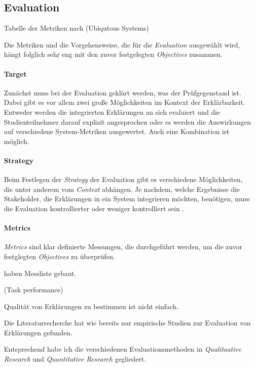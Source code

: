 \subsection{Evaluation}
\label{sec:model_evaluation}

Tabelle der Metriken nach \cite{carvalho2017quality} (Ubiqutous Systems)

Die Metriken und die Vorgehensweise, die für die \textit{Evaluation} ausgewählt wird, hängt folglich sehr eng mit den zuvor festgelegten \textit{Objectives} zusammen.

\paragraph{Target} Zunächst muss bei der Evaluation geklärt werden, was der Prüfgegenstand ist. Dabei gibt es vor allem zwei große Möglichkeiten im Kontext der Erklärbarkeit. Entweder werden die integrierten Erklärungen an sich evaluiert und die Studienteilnehmer darauf explizit angesprochen oder es werden die Auswirkungen auf verschiedene System-Metriken ausgewertet. Auch eine Kombination ist möglich.

\paragraph{Strategy} Beim Festlegen der \textit{Strategy} der Evaluation gibt es verschiedene Möglichkeiten, die unter anderem vom \textit{Context} abhängen. Je nachdem, welche Ergebnisse die Stakeholder, die Erklärungen in ein System integrieren möchten, benötigen, muss die Evaluation kontrollierter oder weniger kontrolliert sein \cite[vgl.][]{wohlin2012experimentation}.

\paragraph{Metrics} \textit{Metrics} sind klar definierte Messungen, die durchgeführt werden, um die zuvor festglegten \textit{Objectives} zu überprüfen.

\cite{tintarev_designing_nodate} haben Messliste gebaut.

(Task performance) \cite{martin_evaluating_2021}

Qualität von Erklärungen zu bestimmen ist nicht einfach.

Die Literaturrecherche hat wie bereits \cite{nunes_systematic_2017} nur empirische Studien zur Evaluation von Erklärungen gefunden.

Entsprechend \cite{wohlin2012experimentation} habe ich die verschiedenen Evaluationsmethoden in \textit{Qualitaative Research} und \textit{Quantitative Research} gegliedert.

